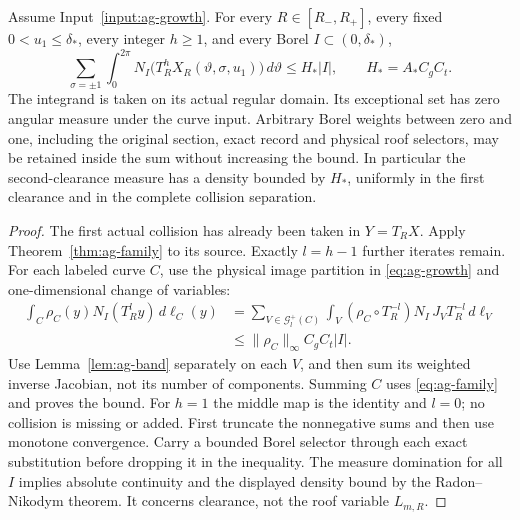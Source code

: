 \begin{theorem}
\label{thm:ag-kernel}
Assume Input~\ref{input:ag-growth}. For every $R\in[R_-,R_+]$,
every fixed $0<u_1\le\delta_*$, every integer $h\ge1$, and every
Borel $I\subset(0,\delta_*)$,
\begin{equation}\label{eq:ag-kernel}
 \sum_{\sigma=\pm1}\int_0^{2\pi}
 N_I\bigl(T_R^hX_R(\vartheta,\sigma,u_1)\bigr)\,d\vartheta
       \le H_*|I|,\qquad H_*=A_*C_gC_t.
\end{equation}
The integrand is taken on its actual regular domain. Its exceptional
set has zero angular measure under the curve input. Arbitrary Borel
weights between zero and one, including the original section, exact
record and physical roof selectors, may be retained inside the sum
without increasing the bound. In particular the second-clearance
measure has a density bounded by $H_*$, uniformly in the first
clearance and in the complete collision separation.
\end{theorem}
\begin{proof}
The first actual collision has already been taken in
$Y=T_RX$. Apply Theorem~\ref{thm:ag-family} to its source.
Exactly $l=h-1$ further iterates remain. For each labeled curve
$C$, use the physical image partition in
\eqref{eq:ag-growth} and one-dimensional change of variables:
\begin{align*}
 \int_C \rho_C(y)N_I(T_R^ly)\,d\ell_C(y)
 &=\sum_{V\in\mathcal G_l^+(C)}\int_V
    (\rho_C\circ T_R^{-l})N_I\,J_VT_R^{-l}\,d\ell_V\!\!\\
 &\le \|\rho_C\|_\infty C_g C_t |I|.
\end{align*}
Use Lemma~\ref{lem:ag-band} separately on each $V$, and then sum
its weighted inverse Jacobian, not its number of components.
Summing $C$ uses \eqref{eq:ag-family} and proves the bound. For
$h=1$ the middle map is the identity and $l=0$; no collision is
missing or added. First truncate the nonnegative sums and then
use monotone convergence. Carry a bounded Borel selector through
each exact substitution before dropping it in the inequality.
The measure domination for all $I$ implies absolute continuity
and the displayed density bound by the Radon--Nikodym theorem.
It concerns clearance, not the roof variable $L_{m,R}$.
\end{proof}

